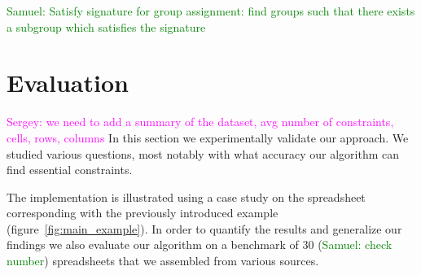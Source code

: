 \documentclass{ecai}
\newcommand{\sergey}[1]{\textcolor{magenta}{{\sc Sergey:} #1}\xspace}
\newcommand{\samuel}[1]{\textcolor{green}{{\sc Samuel:} #1}\xspace}
\newcommand{\constraints}{\ensuremath{\mathcal{T}}\xspace}
\newcommand{\format}[1]{\textit{#1}\xspace}
\newcommand{\extractgroups}{\format{extractGroups}}
\newcommand{\extracttables}{\format{extractTables}}
\newcommand{\learnconstraints}{\format{learnConstraints}}
\newcommand{\dependencies}{\ensuremath{\mathcal{D}}\xspace}
\begin{document}
\samuel{Satisfy signature for group assignment: find groups such that there exists a subgroup which satisfies the signature}




\section{Evaluation}
\sergey{we need to add a summary of the dataset, avg number of constraints, cells, rows, columns}
In this section we experimentally validate our approach.
We studied various questions, most notably with what accuracy our algorithm can find essential constraints.

The implementation is illustrated using a case study on the spreadsheet corresponding with the previously introduced example (figure~\ref{fig:main_example}).
In order to quantify the results and generalize our findings we also evaluate our algorithm on a benchmark of 30 (\samuel{check number}) spreadsheets that we assembled from various sources.
\end{document}
